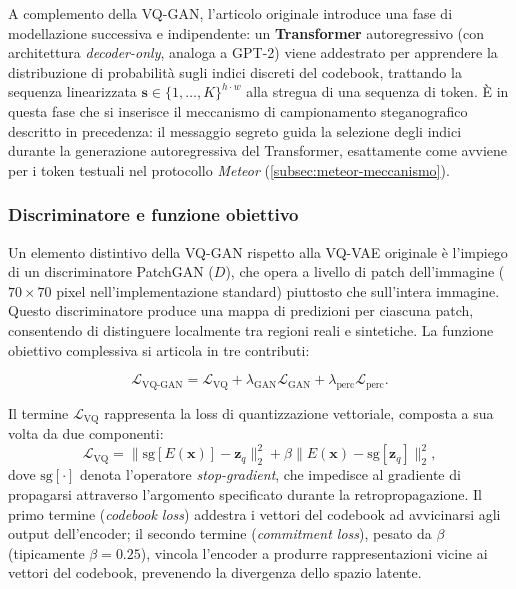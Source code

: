 A complemento della VQ-GAN, l'articolo originale \cite{esser-2020} introduce una fase di modellazione successiva e indipendente: un \textbf{Transformer} autoregressivo (con architettura \emph{decoder-only}, analoga a GPT-2) viene addestrato per apprendere la distribuzione di probabilità sugli indici discreti del codebook, trattando la sequenza linearizzata $\mathbf{s} \in \{1, \dots, K\}^{h \cdot w}$ alla stregua di una sequenza di token. È in questa fase che si inserisce il meccanismo di campionamento steganografico descritto in precedenza: il messaggio segreto guida la selezione degli indici durante la generazione autoregressiva del Transformer, esattamente come avviene per i token testuali nel protocollo \emph{Meteor} (\autoref{subsec:meteor-meccanismo}).

\subsubsection{Discriminatore e funzione obiettivo}
Un elemento distintivo della VQ-GAN rispetto alla VQ-VAE originale è l'impiego di un discriminatore PatchGAN \cite{isola-2017} ($D$), che opera a livello di patch dell'immagine ($70 \times 70$ pixel nell'implementazione standard) piuttosto che sull'intera immagine. Questo discriminatore produce una mappa di predizioni per ciascuna patch, consentendo di distinguere localmente tra regioni reali e sintetiche. La funzione obiettivo complessiva si articola in tre contributi:

\begin{equation}
\mathcal{L}_{\text{VQ-GAN}} = \mathcal{L}_{\text{VQ}} + \lambda_{\text{GAN}} \mathcal{L}_{\text{GAN}} + \lambda_{\text{perc}} \mathcal{L}_{\text{perc}}.
\end{equation}

Il termine $\mathcal{L}_{\text{VQ}}$ rappresenta la loss di quantizzazione vettoriale, composta a sua volta da due componenti:
\begin{equation}
\mathcal{L}_{\text{VQ}} = \|\mathrm{sg}[E(\mathbf{x})] - \mathbf{z}_q\|_2^2 + \beta \|E(\mathbf{x}) - \mathrm{sg}[\mathbf{z}_q]\|_2^2,
\end{equation}
dove $\mathrm{sg}[\cdot]$ denota l'operatore \emph{stop-gradient}, che impedisce al gradiente di propagarsi attraverso l'argomento specificato durante la retropropagazione. Il primo termine (\emph{codebook loss}) addestra i vettori del codebook ad avvicinarsi agli output dell'encoder; il secondo termine (\emph{commitment loss}), pesato da $\beta$ (tipicamente $\beta = 0.25$), vincola l'encoder a produrre rappresentazioni vicine ai vettori del codebook, prevenendo la divergenza dello spazio latente.

